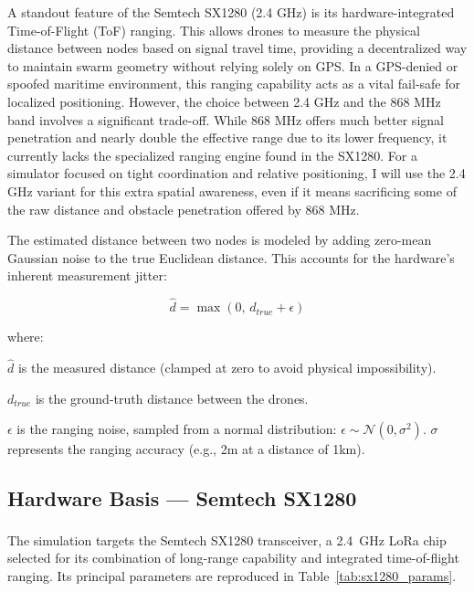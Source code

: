 A standout feature of the Semtech SX1280 (2.4 GHz) is its hardware-integrated Time-of-Flight (ToF) ranging. This allows drones to measure the physical distance between nodes based on signal travel time, providing a decentralized way to maintain swarm geometry without relying solely on GPS. In a GPS-denied or spoofed maritime environment, this ranging capability acts as a vital fail-safe for localized positioning.
However, the choice between 2.4 GHz and the 868 MHz band involves a significant trade-off. While 868 MHz offers much better signal penetration and nearly double the effective range due to its lower frequency, it currently lacks the specialized ranging engine found in the SX1280. For a simulator focused on tight coordination and relative positioning, I will use the 2.4 GHz variant for this extra spatial awareness, even if it means sacrificing some of the raw distance and obstacle penetration offered by 868 MHz.


The estimated distance between two nodes is modeled by adding zero-mean Gaussian noise to the true Euclidean distance. This accounts for the hardware's inherent measurement jitter:

\begin{equation}
    \hat{d} = \max(0, \, d_{true} + \epsilon)
     \label{eq:ToF}
\end{equation}


where:

$\hat{d}$ is the measured distance (clamped at zero to avoid physical impossibility).

$d_{true}$ is the ground-truth distance between the drones.

$\epsilon$ is the ranging noise, sampled from a normal distribution: $\epsilon \sim \mathcal{N}(0, \sigma^2)$.
$\sigma$ represents the ranging accuracy (e.g., 2m at a distance of 1km).

\subsection{Hardware Basis — Semtech SX1280}
\label{sec:lora_hardware}

The simulation targets the Semtech SX1280 transceiver, a 2.4~GHz
LoRa\textsuperscript{\textregistered} chip selected for its combination
of long-range capability and integrated time-of-flight ranging. Its
principal parameters are reproduced in Table~\ref{tab:sx1280_params}.


